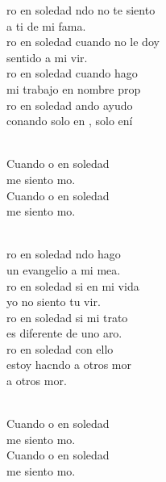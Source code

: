\begin{cancion}%
	ro en soledad ndo no te siento \\
	a ti de mi fama.\\
	ro en soledad cuando no le doy \\
	sentido a mi vir.\\
	ro en soledad cuando hago \\
	mi trabajo en nombre prop\\
	ro en soledad ando ayudo \\
	conando solo en , solo ení\\\jump\\
	\begin{chorus}%
	Cuando o en soledad \\
	me siento mo.\\
	Cuando o en soledad \\
	me siento mo. \\
	\end{chorus}%
	\jump\\
	ro en soledad ndo hago \\
	un evangelio a mi mea.\\
	ro en soledad si en mi vida\\
	yo no siento tu vir.\\
	ro en soledad si mi trato \\
	es diferente de uno aro.\\
	ro en soledad con ello \\
	estoy hacndo a otros mor \\
	a otros mor.\\\jump\\
	\begin{chorus}%
	Cuando o en soledad \\
	me siento mo.\\
	Cuando o en soledad \\
	me siento mo. \\

\end{chorus}
\end{cancion}
